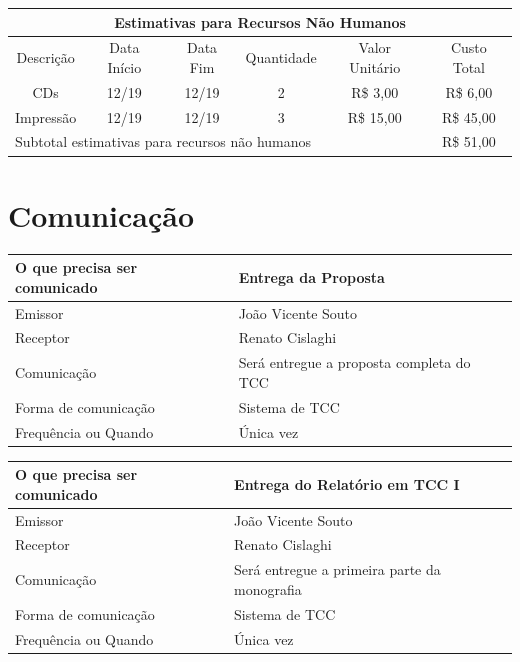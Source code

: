 \documentclass[
  12pt,       %
  openright,      %
  twoside,      %
  a4paper,      %
  english,      %
  brazil,       %
  ]{abntex2}
\begin{document}
\begin{center}
\begin{tabular}{|c|c|c|c|c|c|}
\hline
\multicolumn{6}{|c|}{Estimativas para Recursos Não Humanos} \\ \hline
    Descrição & Data Início & Data Fim & Quantidade & Valor Unitário & Custo Total \\
    \hline
    CDs       & 12/19 & 12/19 & 2 & R\$ 3,00  & R\$ 6,00 \\ \hline
    Impressão & 12/19 & 12/19 & 3 & R\$ 15,00 & R\$ 45,00 \\ \hline
\multicolumn{5}{|l|}{Subtotal estimativas para recursos não humanos} & R\$ 51,00 \\
\hline
\end{tabular}
\end{center}

\section{Comunicação}

\begin{center}
\begin{tabular}{|l|p{9cm}|}
\hline
    O que precisa ser comunicado & Entrega da Proposta \\ \hline
    Emissor & João Vicente Souto \\ \hline
    Receptor & Renato Cislaghi \\ \hline
    Comunicação & Será entregue a proposta completa do TCC \\ \hline
    Forma de comunicação & Sistema de TCC \\ \hline
    Frequência ou Quando & Única vez \\ \hline
\end{tabular}
\end{center}

\begin{center}
\begin{tabular}{|l|p{9cm}|}
\hline
    O que precisa ser comunicado & Entrega do Relatório em TCC I \\ \hline
    Emissor & João Vicente Souto \\ \hline
    Receptor & Renato Cislaghi \\ \hline
    Comunicação & Será entregue a primeira parte da monografia \\ \hline
    Forma de comunicação & Sistema de TCC \\ \hline
    Frequência ou Quando & Única vez \\ \hline
\end{tabular}
\end{center}
\end{document}
